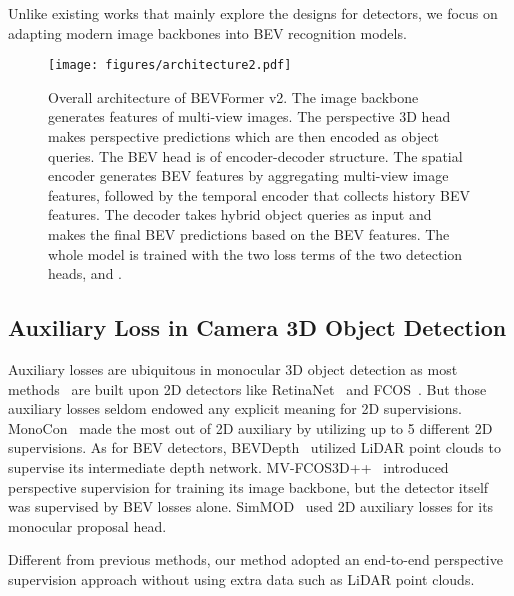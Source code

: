 \documentclass[10pt,twocolumn,letterpaper]{article}
\begin{document}
Unlike existing works that mainly explore the designs for detectors, we focus on adapting modern image backbones into BEV recognition models. 

\begin{figure*}[t]
    \centering
    \texttt{[image: figures/architecture2.pdf]}
    \caption{Overall architecture of BEVFormer v2. The image backbone generates features of multi-view images. The perspective 3D head makes perspective predictions which are then encoded as object queries. The BEV head is of encoder-decoder structure. The spatial encoder generates BEV features by aggregating multi-view image features, followed by the temporal encoder that collects history BEV features. The decoder takes hybrid object queries as input and makes the final BEV predictions based on the BEV features. The whole model is trained with the two loss terms of the two detection heads,  and .}
    \label{fig:architecture}
\end{figure*}

\subsection{Auxiliary Loss in Camera 3D Object Detection}
Auxiliary losses are ubiquitous in monocular 3D object detection as most methods~\cite{MonoDIS,monoflex,fcos3d,DD3D,MonoCon,bevdepth,mv-fcos3d} are built upon 2D detectors like RetinaNet~\cite{RetinaNet} and FCOS~\cite{fcos}.
But those auxiliary losses seldom endowed any explicit meaning for 2D supervisions.
MonoCon~\cite{MonoCon} made the most out of 2D auxiliary by utilizing up to 5 different 2D supervisions.
As for BEV detectors, BEVDepth~\cite{bevdepth} utilized LiDAR point clouds to supervise its intermediate depth network.
MV-FCOS3D++~\cite{mv-fcos3d} introduced perspective supervision for training its image backbone, but the detector itself was supervised by BEV losses alone.
SimMOD~\cite{SimMOD} used 2D auxiliary losses for its monocular proposal head.

Different from previous methods, our method adopted an end-to-end perspective supervision approach without using extra data such as LiDAR point clouds.
\end{document}
